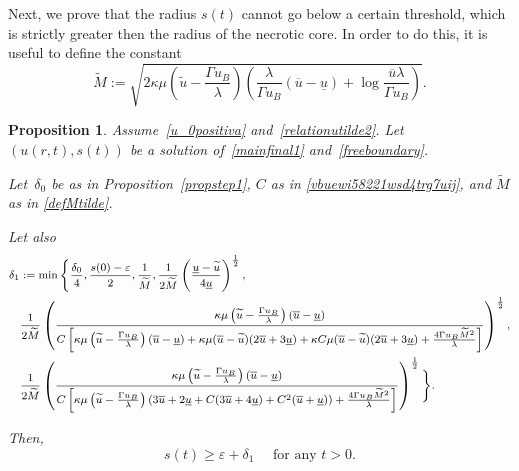 \documentclass[12pt,a4paper,intlimits,sumlimits]{amsart}
\theoremstyle{definition}
\theoremstyle{plain}
\newtheorem{proposition}[definition]{Proposition}
\numberwithin{equation}{section}
\renewcommand{\geq}{\geqslant}
\begin{document}
Next, we prove that the radius $s(t)$ cannot go below a certain threshold, which is strictly greater then the radius of the necrotic core. In order to do this, it is useful to define the constant
\begin{equation}\label{defMtilde}
\widetilde M:=\sqrt{2\kappa\mu \left(\widetilde u-\frac{\Gamma u_B}{\lambda} \right)\left(\frac{\lambda}{\Gamma u_B}(\overline u-\underline u)+\log\frac{\overline u \lambda}{\Gamma u_B}\right)}.
\end{equation}

\begin{proposition}\label{propstep2}
Assume~\eqref{u_0positiva} and~\eqref{relationutilde2}.
Let $(u(r,t), s(t))$ be a solution of~\eqref{mainfinal1} and~\eqref{freeboundary}.

Let~$\delta_0$ be as in Proposition~\ref{propstep1}, $C$ as in \eqref{vbuewi58221wsd4trg7uij}, and $\widetilde M$ as in \eqref{defMtilde}.

Let also
\begin{equation}\label{delta1esplicita}{\footnotesize
\begin{aligned}
\delta_1&:=\min\Bigg\{\frac{\delta_0}{4},\frac{s(0)-\varepsilon}{2},\frac{1}{\widetilde M},
\frac{1}{2\widetilde M}\left(\frac{\underline u-\widetilde u}{4\underline u}\right)^\frac{1}{2}, \\
&\frac{1}{2\widetilde M}\left(\frac{\kappa\mu\left(\widetilde u-\frac{\Gamma u_B}{\lambda} \right)(\overline u-\underline u)}{C\left[\kappa\mu\left(\widetilde u-\frac{\Gamma u_B}{\lambda} \right)(\overline u-\underline u)+\kappa\mu (\overline u-\widetilde u)(2\overline u +3\underline u)
+\kappa C \mu(\overline u-\widetilde u)(2\overline u+3\underline u)+\frac{4\Gamma u_B \widetilde M^2}{\lambda}
\right]}\right)^\frac{1}{2}, \\
&\frac{1}{2\widetilde M}\left(\frac{\kappa\mu\left(\widetilde u-\frac{\Gamma u_B}{\lambda} \right)(\overline u-\underline u)}{C\left[\kappa\mu\left(\widetilde u-\frac{\Gamma u_B}{\lambda} \right)\left(3\overline u+2\underline u+C(3\overline u+4\underline u)+C^2(\overline u+\underline u) \right)+\frac{4\Gamma u_B \widetilde M^2}{\lambda}
\right]}\right)^\frac{1}{2}
\Bigg\}.
\end{aligned}}
\end{equation}

Then,
\begin{equation}\label{eqstep2}
s(t)\geq \varepsilon+\delta_1 \quad \mbox{ for any }t>0.
\end{equation}
\end{proposition}
\end{document}
